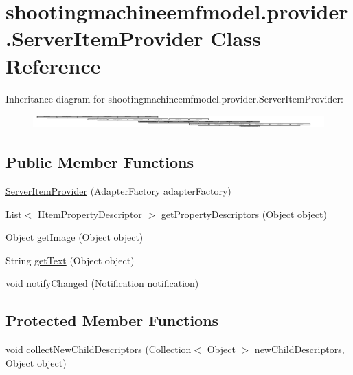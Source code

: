 \hypertarget{classshootingmachineemfmodel_1_1provider_1_1_server_item_provider}{\section{shootingmachineemfmodel.\-provider.\-Server\-Item\-Provider Class Reference}
\label{classshootingmachineemfmodel_1_1provider_1_1_server_item_provider}
}
Inheritance diagram for shootingmachineemfmodel.\-provider.\-Server\-Item\-Provider\-:\begin{figure}[H]
\begin{center}
\leavevmode
\includegraphics[height=0.534759cm]{classshootingmachineemfmodel_1_1provider_1_1_server_item_provider}
\end{center}
\end{figure}
\subsection*{Public Member Functions}
\begin{DoxyCompactItemize}
\item 
\hyperlink{classshootingmachineemfmodel_1_1provider_1_1_server_item_provider_a38654c5bd64e20b45fee1958b9c7d152}{Server\-Item\-Provider} (Adapter\-Factory adapter\-Factory)
\item 
List$<$ I\-Item\-Property\-Descriptor $>$ \hyperlink{classshootingmachineemfmodel_1_1provider_1_1_server_item_provider_a239e126b393213716c44923e4af8b2cb}{get\-Property\-Descriptors} (Object object)
\item 
Object \hyperlink{classshootingmachineemfmodel_1_1provider_1_1_server_item_provider_a8c6bef17cce313eec66282a6d605f416}{get\-Image} (Object object)
\item 
String \hyperlink{classshootingmachineemfmodel_1_1provider_1_1_server_item_provider_a70ea3b74026ee549acb3318a0a699999}{get\-Text} (Object object)
\item 
void \hyperlink{classshootingmachineemfmodel_1_1provider_1_1_server_item_provider_a517d5256d3884df0c80d925f75da0cce}{notify\-Changed} (Notification notification)
\end{DoxyCompactItemize}
\subsection*{Protected Member Functions}
\begin{DoxyCompactItemize}
\item 
void \hyperlink{classshootingmachineemfmodel_1_1provider_1_1_server_item_provider_acdfffaa23e2f1e001ae1b5bbec0de104}{collect\-New\-Child\-Descriptors} (Collection$<$ Object $>$ new\-Child\-Descriptors, Object object)
\end{DoxyCompactItemize}


